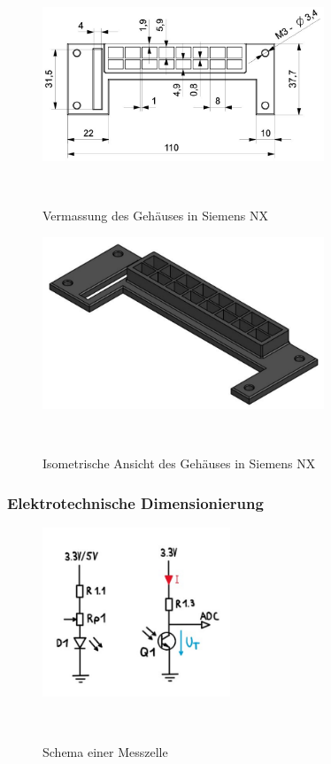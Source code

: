 \documentclass[main.tex]{subfiles} %
\begin{document}
\begin{figure}[H]
    \centering
    \includegraphics[width=0.75\textwidth]{fig_Strecke_Tracken/Gehaeuse_Vermasst.pdf}
    \caption{Vermassung des Gehäuses in Siemens NX}~\label{fig:Gehaeuse_Vermasst}
\end{figure}

\begin{figure}[H]
    \centering
    \includegraphics[width=0.75\textwidth]{fig_Strecke_Tracken/Gehaeuse_Isometrisch.pdf}
    \caption{Isometrische Ansicht des Gehäuses in Siemens NX}~\label{fig:Gehaeuse_Isometrisch}
\end{figure}




\subsubsection{Elektrotechnische Dimensionierung}

\begin{figure}[H]
    \centering
    \includegraphics[width=0.5\textwidth]{fig_Strecke_Tracken/Schema_Messzelle_Liniensensor.pdf}
    \caption{Schema einer Messzelle}~\label{fig:Messzelle}
\end{figure}
\end{document}
